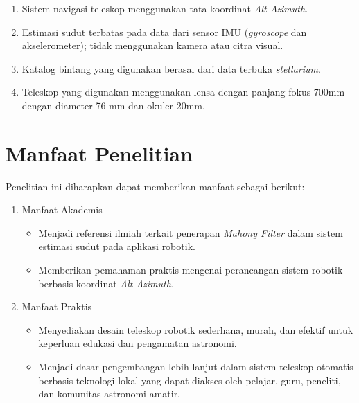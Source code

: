 \begin{enumerate}[noitemsep]
	\item Sistem navigasi teleskop menggunakan tata koordinat  \textit{Alt-Azimuth}.
	
	\item Estimasi sudut terbatas pada data dari sensor IMU (\textit{gyroscope} dan akselerometer); tidak menggunakan kamera atau citra visual.
	
	\item Katalog bintang yang digunakan berasal dari data terbuka \textit{stellarium}.
	
	\item Teleskop yang digunakan menggunakan lensa dengan panjang fokus 700mm dengan diameter 76 mm dan okuler 20mm.
\end{enumerate}



\section{Manfaat Penelitian} \label{I.Manfaat}
Penelitian ini diharapkan dapat memberikan manfaat sebagai berikut:
	\begin{enumerate}[noitemsep]
		\item Manfaat Akademis 
		\begin{itemize}
			\item Menjadi referensi ilmiah terkait penerapan \textit{Mahony Filter} dalam sistem estimasi sudut pada aplikasi robotik.
			
			\item Memberikan pemahaman praktis mengenai perancangan sistem robotik berbasis koordinat \textit{Alt-Azimuth}.
		\end{itemize}
	
	\item Manfaat Praktis
	\begin{itemize}
		\item Menyediakan desain teleskop robotik sederhana, murah, dan efektif untuk keperluan edukasi dan pengamatan astronomi.
		
		\item Menjadi dasar pengembangan lebih lanjut dalam sistem teleskop otomatis berbasis teknologi lokal yang dapat diakses oleh pelajar, guru, peneliti, dan komunitas astronomi amatir.
	\end{itemize}
\end{enumerate}






